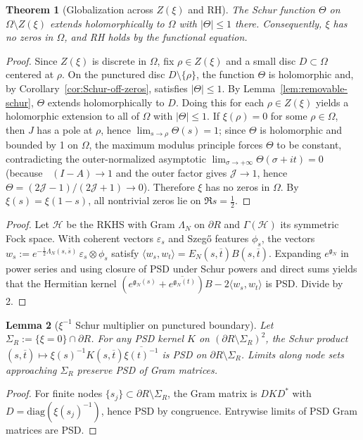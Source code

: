 \documentclass[11pt]{article}
\newtheorem{theorem}{Theorem}
\newtheorem{lemma}[theorem]{Lemma}
\theoremstyle{definition}
\theoremstyle{remark}
\DeclareMathOperator{\dettwo}{det_2}
\begin{document}
\begin{theorem}[Globalization across \(Z(\xi)\) and RH]\label{thm:globalize-RH}
The Schur function \(\Theta\) on \(\Omega\setminus Z(\xi)\) extends holomorphically to \(\Omega\) with \(|\Theta|\le 1\) there. Consequently, \(\xi\) has no zeros in \(\Omega\), and RH holds by the functional equation.
\end{theorem}
\begin{proof}
Since \(Z(\xi)\) is discrete in \(\Omega\), fix \(\rho\in Z(\xi)\) and a small disc \(D\subset\Omega\) centered at \(\rho\). On the punctured disc \(D\setminus\{\rho\}\), the function \(\Theta\) is holomorphic and, by Corollary~\ref{cor:Schur-off-zeros}, satisfies \(|\Theta|\le 1\). By Lemma~\ref{lem:removable-schur}, \(\Theta\) extends holomorphically to \(D\). Doing this for each \(\rho\in Z(\xi)\) yields a holomorphic extension to all of \(\Omega\) with \(|\Theta|\le 1\). If \(\xi(\rho)=0\) for some \(\rho\in\Omega\), then \(J\) has a pole at \(\rho\), hence \(\lim_{s\to\rho}\Theta(s)=1\); since \(\Theta\) is holomorphic and bounded by 1 on \(\Omega\), the maximum modulus principle forces \(\Theta\) to be constant, contradicting the outer-normalized asymptotic \(\lim_{\sigma\to+\infty}\Theta(\sigma+it)=0\) (because \(\dettwo(I-A)\to 1\) and the outer factor gives \(\mathcal J\to 1\), hence \(\Theta=(2\mathcal J-1)/(2\mathcal J+1)\to 0\)). Therefore \(\xi\) has no zeros in \(\Omega\). By \(\xi(s)=\xi(1-s)\), all nontrivial zeros lie on \(\Re s=\tfrac12\).
\end{proof}
\begin{proof}
Let \(\mathcal H\) be the RKHS with Gram \(\Lambda_N\) on \(\partial R\) and \(\Gamma(\mathcal H)\) its symmetric Fock space. With coherent vectors \(\varepsilon_s\) and Szeg\H{o} features \(\phi_s\), the vectors \(w_s:=e^{-\frac12\Lambda_N(s,\overline s)}\,\varepsilon_s\otimes\phi_s\) satisfy \(\langle w_s,w_t\rangle=E_N(s,\overline t)B(s,\overline t)\). Expanding \(e^{\mathfrak g_N}\) in power series and using closure of PSD under Schur powers and direct sums yields that the Hermitian kernel \((e^{\mathfrak g_N(s)}+\overline{e^{\mathfrak g_N(t)}})B-2\langle w_s,w_t\rangle\) is PSD. Divide by 2.
\end{proof}

\begin{lemma}[\(\xi^{-1}\) Schur multiplier on punctured boundary]\label{lem:schur-punctured}
Let \(\Sigma_R:=\{\xi=0\}\cap\partial R\). For any PSD kernel \(K\) on \((\partial R\setminus\Sigma_R)^2\), the Schur product \( (s,\overline t)\mapsto \xi(s)^{-1}K(s,\overline t)\overline{\xi(t)^{-1}}\) is PSD on \(\partial R\setminus\Sigma_R\). Limits along node sets approaching \(\Sigma_R\) preserve PSD of Gram matrices.
\end{lemma}
\begin{proof}
For finite nodes \(\{s_j\}\subset\partial R\setminus\Sigma_R\), the Gram matrix is \(D K D^*\) with \(D=\mathrm{diag}(\xi(s_j)^{-1})\), hence PSD by congruence. Entrywise limits of PSD Gram matrices are PSD.
\end{proof}
\end{document}
